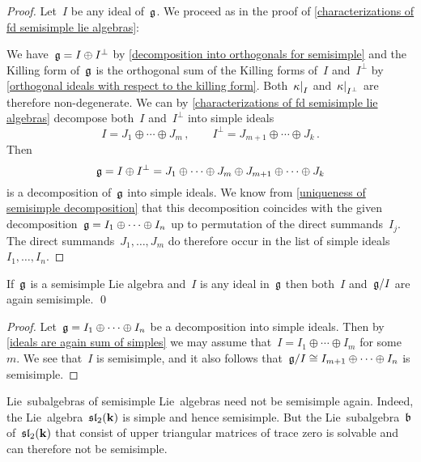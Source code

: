 \begin{proof}
  Let~$I$ be any ideal of~$\mathfrak{g}$.
  We proceed as in the proof of \cref{characterizations of fd semisimple lie algebras}:
  
  We have~$\mathfrak{g} = I \oplus I^\perp$ by \cref{decomposition into orthogonals for semisimple} and the Killing form of~$\mathfrak{g}$ is the orthogonal sum of the Killing forms of~$I$ and~$I^\perp$ by \cref{orthogonal ideals with respect to the killing form}.
  Both~$\restrict{\kappa}{I}$ and~$\restrict{\kappa}{I^\perp}$ are therefore non-degenerate.
  We can by \cref{characterizations of fd semisimple lie algebras} decompose both~$I$ and~$I^\perp$ into simple ideals
  \[
    I
    =
    J_1 \oplus \dotsb \oplus J_m \,,
    \qquad
    I^\perp
    =
    J_{m+1} \oplus \dotsb \oplus J_k  \,.
  \]
  Then
  \[
    \mathfrak{g}
    =
    I \oplus I^\perp
    =
    J_1 \oplus \dotsb \oplus J_m \oplus J_{m+1} \oplus \dotsb \oplus J_k
  \]
  is a decomposition of~$\mathfrak{g}$ into simple ideals.
  We know from \cref{uniqueness of semisimple decomposition} that this decomposition coincides with the given decomposition~$\mathfrak{g} = I_1 \oplus \dotsb \oplus I_n$ up to permutation of the direct summands~$I_j$.
  The direct summands~$J_1, \dotsc, J_m$ do therefore occur in the list of simple ideals~$I_1, \dotsc, I_n$.
\end{proof}


\begin{corollary}
  \label{ideals and quotients of semisimple again semisimple}
  If~$\mathfrak{g}$ is a semisimple Lie algebra and~$I$ is any ideal in~$\mathfrak{g}$ then both~$I$ and~$\mathfrak{g}/I$ are again semisimple.
  \qed
\end{corollary}


\begin{proof}
  Let~$\mathfrak{g} = I_1 \oplus \dotsb \oplus I_n$ be a decomposition into simple ideals.
  Then by \cref{ideals are again sum of simples} we may assume that~$I = I_1 \oplus \dotsb \oplus I_m$ for some~$m$.
  We see that~$I$ is semisimple, and it also follows that~$\mathfrak{g}/I \cong I_{m+1} \oplus \dotsb \oplus I_n$ is semisimple.
\end{proof}


\begin{warning}
  Lie~subalgebras of semisimple Lie~algebras need not be semisimple again.
  Indeed, the Lie~algebra~$\mathfrak{sl}_2(\mathbf{k})$ is simple and hence semisimple.
  But the Lie~subalgebra~$\mathfrak{b}$ of~$\mathfrak{sl}_2(\mathbf{k})$ that consist of upper triangular matrices of trace zero is solvable and can therefore not be semisimple.
\end{warning}



